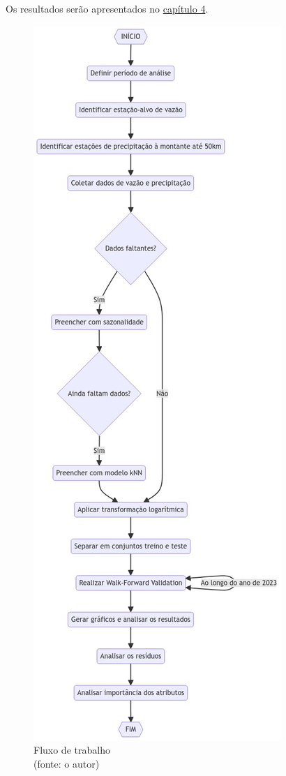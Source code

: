 Os resultados serão apresentados no \hyperref[cap:capitulo4]{capítulo 4}.
\clearpage

\begin{figure}[!h]
	\centering
	\includegraphics[scale=0.4]{Figuras/flowchart.png}
	\caption{Fluxo de trabalho\\(fonte: o autor)}
	\label{fig:fluxo_trabalho}
\end{figure}